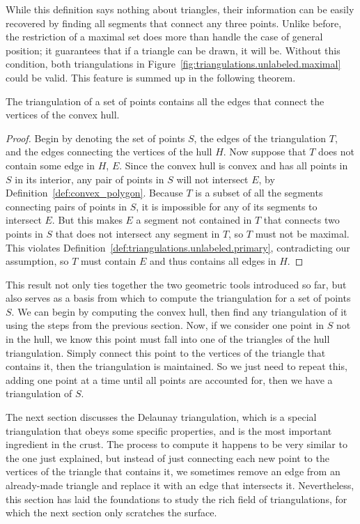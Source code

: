 
While this definition says nothing about triangles, their information can be easily recovered by finding all segments that connect any three points.
Unlike before, the restriction of a maximal set does more than handle the case of general position; it guarantees that if a triangle can be drawn, it will be.
Without this condition, both triangulations in Figure~\ref{fig:triangulations.unlabeled.maximal} could be valid.
This feature is summed up in the following theorem.

\begin{theorem}
	The triangulation of a set of points contains all the edges that connect the vertices of the convex hull.
\end{theorem}
\begin{proof}
	Begin by denoting the set of points $S$, the edges of the triangulation $T$, and the edges connecting the vertices of the hull $H$.
	Now suppose that $T$ does not contain some edge in $H$, $E$.
	Since the convex hull is convex and has all points in $S$ in its interior, any pair of points in $S$ will not intersect $E$, by Definition~\ref{def:convex_polygon}.
	Because $T$ is a subset of all the segments connecting pairs of points in $S$, it is impossible for any of its segments to intersect $E$.
	But this makes $E$ a segment not contained in $T$ that connects two points in $S$ that does not intersect any segment in $T$, so $T$ must not be maximal.
	This violates Definition~\ref{def:triangulations.unlabeled.primary}, contradicting our assumption, so $T$ must contain $E$ and thus contains all edges in $H$.
\end{proof}

This result not only ties together the two geometric tools introduced so far, but also serves as a basis from which to compute the triangulation for a set of points $S$.
We can begin by computing the convex hull, then find any triangulation of it using the steps from the previous section.
Now, if we consider one point in $S$ not in the hull, we know this point must fall into one of the triangles of the hull triangulation.
Simply connect this point to the vertices of the triangle that contains it, then the triangulation is maintained.
So we just need to repeat this, adding one point at a time until all points are accounted for, then we have a triangulation of $S$.

The next section discusses the Delaunay triangulation, which is a special triangulation that obeys some specific properties, and is the most important ingredient in the crust.
The process to compute it happens to be very similar to the one just explained, but instead of just connecting each new point to the vertices of the triangle that contains it, we sometimes remove an edge from an already-made triangle and replace it with an edge that intersects it.
Nevertheless, this section has laid the foundations to study the rich field of triangulations, for which the next section only scratches the surface.
